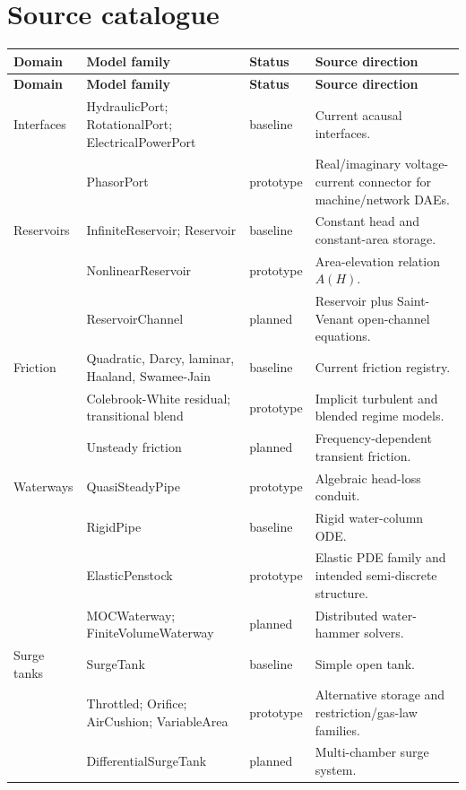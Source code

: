 \documentclass[10pt,a4paper]{article}
\begin{document}
\section{Source catalogue}
\small
\begin{longtable}{p{2.6cm}p{5.3cm}p{2.1cm}p{5.0cm}}
\toprule
\textbf{Domain} & \textbf{Model family} & \textbf{Status} & \textbf{Source direction} \\
\midrule
\endfirsthead
\toprule
\textbf{Domain} & \textbf{Model family} & \textbf{Status} & \textbf{Source direction} \\
\midrule
\endhead
Interfaces &
HydraulicPort; RotationalPort; ElectricalPowerPort &
baseline &
Current acausal interfaces. \\
&
PhasorPort &
prototype &
Real/imaginary voltage-current connector for machine/network DAEs. \\[0.7ex]

Reservoirs &
InfiniteReservoir; Reservoir &
baseline &
Constant head and constant-area storage. \\
&
NonlinearReservoir &
prototype &
Area-elevation relation $A(H)$. \\
&
ReservoirChannel &
planned &
Reservoir plus Saint-Venant open-channel equations. \\[0.7ex]

Friction &
Quadratic, Darcy, laminar, Haaland, Swamee-Jain &
baseline &
Current friction registry. \\
&
Colebrook-White residual; transitional blend &
prototype &
Implicit turbulent and blended regime models. \\
&
Unsteady friction &
planned &
Frequency-dependent transient friction. \\[0.7ex]

Waterways &
QuasiSteadyPipe &
prototype &
Algebraic head-loss conduit. \\
&
RigidPipe &
baseline &
Rigid water-column ODE. \\
&
ElasticPenstock &
prototype &
Elastic PDE family and intended semi-discrete structure. \\
&
MOCWaterway; FiniteVolumeWaterway &
planned &
Distributed water-hammer solvers. \\[0.7ex]

Surge tanks &
SurgeTank &
baseline &
Simple open tank. \\
&
Throttled; Orifice; AirCushion; VariableArea &
prototype &
Alternative storage and restriction/gas-law families. \\
&
DifferentialSurgeTank &
planned &
Multi-chamber surge system. \\[0.7ex]


\end{longtable}
\end{document}
